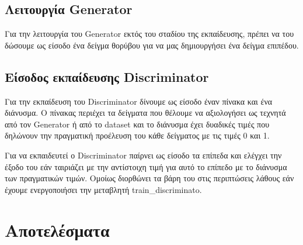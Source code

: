 \subsection{Λειτουργία Generator}
Για την λειτουργία του Generator εκτός του σταδίου της εκπαίδευσης, πρέπει να του δώσουμε ως είσοδο ένα δείγμα θορύβου για να μας δημιουργήσει ένα δείγμα επιπέδου.

\subsection{Είσοδος εκπαίδευσης Discriminator}
Για την εκπαίδευση του Discriminator δίνουμε ως είσοδο έναν πίνακα και ένα διάνυσμα. Ο πίνακας περιέχει τα δείγματα που θέλουμε να αξιολογήσει ως τεχνητά από τον Generator ή από το dataset και το διάνυσμα έχει δυαδικές τιμές που δηλώνουν την πραγματική προέλευση του κάθε δείγματος με τις τιμές 0 και 1.
\par
Για να εκπαιδευτεί ο Discriminator παίρνει ως είσοδο τα επίπεδα και ελέγχει την έξοδο του εάν ταιριάζει με την αντίστοιχη τιμή για αυτό το επίπεδο με το διάνυσμα των πραγματικών τιμών. Ομοίως διορθώνει τα βάρη του στις περιπτώσεις λάθους εάν έχουμε ενεργοποιήσει την μεταβλητή train\_discriminato.


\section{Αποτελέσματα}




